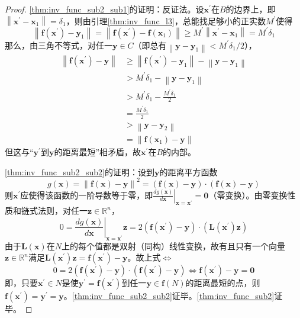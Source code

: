 \documentclass[main.tex]{subfiles}
\begin{document}
\begin{proof}
\ref{thm:inv_func_sub2_sub1}的证明：反证法。设$\mathbf{x}^\prime$在$B$的边界上，即$\left\|\mathbf{x}^\prime-\mathbf{x}_1\right\|=\delta_1$，则由引理\ref{thm:inv_func_l3}，总能找足够小的正实数$M^\prime$使得
\[\left\|\mathbf{f}\left(\mathbf{x}^\prime\right)-\mathbf{y}_1\right\|=\left\|\mathbf{f}\left(\mathbf{x}^\prime\right)-\mathbf{f}\left(\mathbf{x}_1\right)\right\|\geq M^\prime\left\|\mathbf{x}^\prime-\mathbf{x}_1\right\|=M^\prime\delta_1
\]
那么，由三角不等式，对任一$\mathbf{y}\in C$（即总有$\left\|\mathbf{y}-\mathbf{y}_1\right\|<M^\prime\delta_1/2$），
\begin{align*}
\left\|\mathbf{f}\left(\mathbf{x}^\prime\right)-\mathbf{y}\right\|&\geq\left\|\mathbf{f}\left(\mathbf{x}^\prime\right)-\mathbf{y}_1\right\|-\left\|\mathbf{y}-\mathbf{y}_1\right\|\\
&>M^\prime\delta_1-\left\|\mathbf{y}-\mathbf{y}_1\right\|\\
&>M^\prime\delta_1-\frac{M^\prime\delta_1}{2}\\
&=\frac{M^\prime\delta_1}{2}\\
&>\left\|\mathbf{y}-\mathbf{y}_2\right\|\\
&=\left\|\mathbf{f}\left(\mathbf{x}_1\right)-\mathbf{y}\right\|
\end{align*}
但这与“$\mathbf{y}^\prime$到$\mathbf{y}$的距离最短”相矛盾，故$\mathbf{x}^\prime$在$B$的内部。

\ref{thm:inv_func_sub2_sub2}的证明：设到$\mathbf{y}$的距离平方函数
\[
g\left(\mathbf{x}\right)=\left\|\mathbf{f}\left(\mathbf{x}\right)-\mathbf{y}\right\|^2=\left(\mathbf{f}\left(\mathbf{x}\right)-\mathbf{y}\right)\cdot\left(\mathbf{f}\left(\mathbf{x}\right)-\mathbf{y}\right)\]
则$\mathbf{x}^\prime$应使得该函数的一阶导数等于零，即$\left.\frac{dg\left(\mathbf{x}\right)}{d\mathbf{x}}\right|_{\mathbf{x}=\mathbf{x}^\prime}=\mathbf{0}$（零变换）。由零变换性质和链式法则，对任一$\mathbf{z}\in\mathbb{R}^n$，
\[0=\left.\frac{dg\left(\mathbf{x}\right)}{d\mathbf{x}}\right|_{\mathbf{x}=\mathbf{x}^\prime}\mathbf{z}=2\left(\mathbf{f}\left(\mathbf{x}^\prime\right)-\mathbf{y}\right)\cdot\left(\mathbf{L}\left(\mathbf{x}^\prime\right)\mathbf{z}\right)\]
由于$\mathbf{L}\left(\mathbf{x}\right)$在$N$上的每个值都是双射（同构）线性变换，故有且只有一个向量$\mathbf{z}\in\mathbb{R}^n$满足$\mathbf{L}\left(\mathbf{x}^\prime\right)\mathbf{z}=\mathbf{f}\left(\mathbf{x}^\prime\right)-\mathbf{y}$。故上式$\Leftrightarrow$
\[0=2\left(\mathbf{f}\left(\mathbf{x}^\prime\right)-\mathbf{y}\right)\cdot\left(\mathbf{f}\left(\mathbf{x}^\prime\right)-\mathbf{y}\right)\Leftrightarrow\mathbf{f}\left(\mathbf{x}^\prime\right)-\mathbf{y}=\mathbf{0}\]
即，只要$\mathbf{x}^\prime\in N$是使$\mathbf{y}^\prime=\mathbf{f}\left(\mathbf{x}^\prime\right)$到任一$\mathbf{y}\in \mathbf{f}\left(N\right)$的距离最短的点，则$\mathbf{f}\left(\mathbf{x}^\prime\right)=\mathbf{y}^\prime=\mathbf{y}$。\ref{thm:inv_func_sub2_sub2}证毕。\ref{thm:inv_func_sub2}证毕。


\end{proof}
\end{document}
